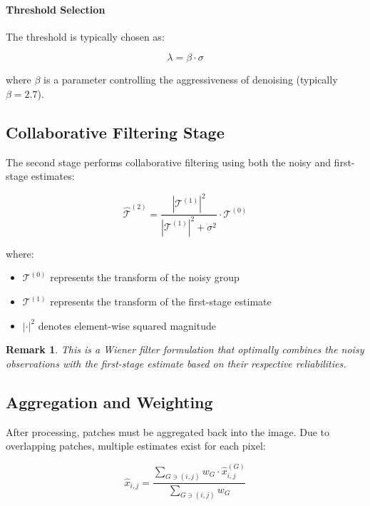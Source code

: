 \documentclass[12pt]{article}
\newtheorem{remark}[theorem]{Remark}
\begin{document}
\paragraph{Threshold Selection}
The threshold is typically chosen as:

\begin{equation}
    \lambda = \beta \cdot \sigma
\end{equation}

where $\beta$ is a parameter controlling the aggressiveness of denoising (typically $\beta = 2.7$).

\subsection{Collaborative Filtering Stage}
\label{subsec:collaborative_filtering}

The second stage performs collaborative filtering using both the noisy and first-stage estimates:

\begin{equation}
    \label{eq:collaborative_filter}
    \hat{\mathcal{T}}^{(2)} = \frac{|\mathcal{T}^{(1)}|^2}{|\mathcal{T}^{(1)}|^2 + \sigma^2} \cdot \mathcal{T}^{(0)}
\end{equation}

where:
\begin{itemize}
    \item $\mathcal{T}^{(0)}$ represents the transform of the noisy group
    \item $\mathcal{T}^{(1)}$ represents the transform of the first-stage estimate
    \item $|\cdot|^2$ denotes element-wise squared magnitude
\end{itemize}

\begin{remark}
    This is a Wiener filter formulation that optimally combines the noisy observations with the first-stage estimate based on their respective reliabilities.
\end{remark}

\subsection{Aggregation and Weighting}
\label{subsec:aggregation}

After processing, patches must be aggregated back into the image. Due to overlapping patches, multiple estimates exist for each pixel:

\begin{equation}
    \label{eq:aggregation}
    \hat{x}_{i,j} = \frac{\sum_{G \ni (i,j)} w_G \cdot \hat{x}_{i,j}^{(G)}}{\sum_{G \ni (i,j)} w_G}
\end{equation}
\end{document}
